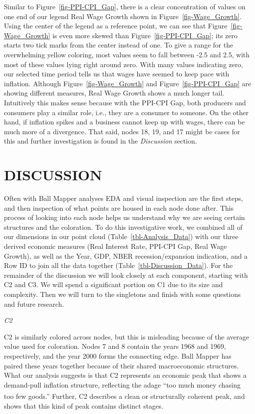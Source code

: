 \documentclass[10pt, letterpaper]{article}
\begin{document}
Similar to Figure~\ref{fig-PPI-CPI_Gap}, there is a clear concentration
of values on one end of our legend Real Wage Growth shown in
Figure~\ref{fig-Wage_Growth}. Using the center of the legend as a
reference point, we can see that Figure~\ref{fig-Wage_Growth} is even
more skewed than Figure~\ref{fig-PPI-CPI_Gap}; its zero starts two tick
marks from the center instead of one. To give a range for the
overwhelming yellow coloring, most values seem to fall between -2.5 and
2.5, with most of these values lying right around zero. With many values
indicating zero, our selected time period tells us that wages have
seemed to keep pace with inflation. Although
Figure~\ref{fig-Wage_Growth} and Figure~\ref{fig-PPI-CPI_Gap} are
showing different measures, Real Wage Growth shows a much longer tail.
Intuitively this makes sense because with the PPI-CPI Gap, both
producers and consumers play a similar role, i.e., they are a consumer
to someone. On the other hand, if inflation spikes and a business cannot
keep up with wages, there can be much more of a divergence. That said,
nodes 18, 19, and 17 might be cases for this and further investigation
is found in the \emph{Discussion} section.

\section{DISCUSSION}\label{discussion}

Often with Ball Mapper analyses EDA and visual inspection are the first
steps, and then inspection of what points are housed in each node done
after. This process of looking into each node helps us understand why we
are seeing certain structures and the coloration. To do this
investigative work, we combined all of our dimensions in our point cloud
(Table~\ref{tbl-Analysis_Data}) with our three derived economic measures
(Real Interest Rate, PPI-CPI Gap, Real Wage Growth), as well as the
Year, GDP, NBER recession/expansion indication, and a Row ID to join all
the data together (Table~\ref{tbl-Discussion_Data}). For the remainder
of the discussion we will look closely at each component, starting with
C2 and C3. We will spend a significant portion on C1 due to its size and
complexity. Then we will turn to the singletons and finish with some
questions and future research.

\emph{C2}

C2 is similarly colored across nodes, but this is misleading because of
the average value used for coloration. Nodes 7 and 8 contain the years
1968 and 1969, respectively, and the year 2000 forms the connecting
edge. Ball Mapper has paired these years together because of their
shared macroeconomic structures. What our analysis suggests is that C2
represents an economic peak that shows a demand-pull inflation
structure, reflecting the adage ``too much money chasing too few
goods.''\textsuperscript{}
Further, C2 describes a clean or structurally coherent peak, and shows
that this kind of peak contains distinct stages.
\end{document}
